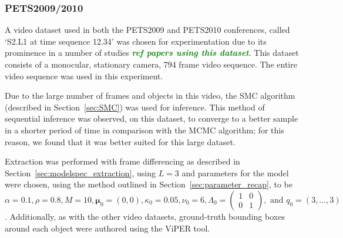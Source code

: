 \documentclass[smallcondensed, final]{svjour3}
\newcommand{\willie}[1]{\textcolor{green}{\textsf{\emph{\textbf{\textcolor{green}{#1}}}}}}
\begin{document}



\subsubsection{PETS2009/2010}

A video dataset used in both the PETS2009 and PETS2010 conferences, called `S2.L1 at time sequence 12.34' was chosen for experimentation due to its prominence in a number of studies \willie{ref papers using this dataset}. This dataset consists of a monocular, stationary camera, 794 frame video sequence. The entire video sequence was used in this experiment. 

Due to the large number of frames and objects in this video, the SMC algorithm (described in Section~\ref{sec:SMC}) was used for inference. This method of sequential inference was observed, on this dataset, to converge to a better sample in a shorter period of time in comparison with the MCMC algorithm; for this reason, we found that it was better suited for this large dataset.

Extraction was performed with frame differencing as described in Section~\ref{sec:modelspec_extraction}, using $L=3$ and parameters for the model were chosen, using the method outlined in Section~\ref{sec:parameter_recap}, to be $\alpha = 0.1, \rho = 0.8, M = 10, \boldsymbol{\mu}_{0} = (0,0), \kappa_{0} = 0.05, \nu_{0} = 6, \Lambda_{0} = \left( \begin{smallmatrix} 1&0\\ 0&1 \end{smallmatrix} \right), \text{ and } q_{0} = (3, \ldots, 3)$. Additionally, as with the other video datasets, ground-truth bounding boxes around each object were authored using the ViPER tool.
\end{document}
